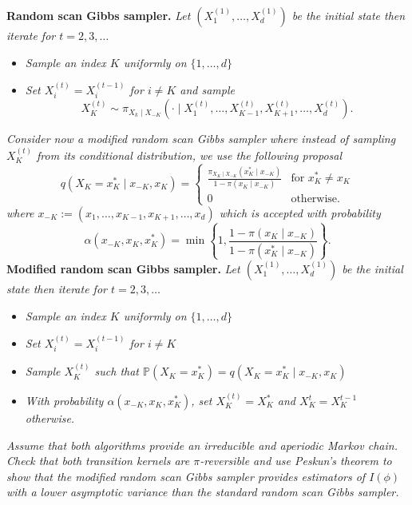\documentclass[a4paper,12pt]{article}
\newcommand{\pr}{\mathbb{P}}
\theoremstyle{definition}
\begin{document}
\begin{enumerate}
    {\bf Random scan Gibbs sampler.} {\it Let $(X_1^{(1)}, \dots, X_d^{(1)})$ be
    the initial state then iterate for $t=2,3,\dots$}
    \begin{itemize}
        \item {\it Sample an index $K$ uniformly on $\{1,\dots,d\}$}
        \item {\it Set $X_i^{(t)} = X_i^{(t-1)}$ for $i \neq K$ and sample}
        $$X_K^{(t)} \sim \pi_{X_k\mid X_{-K}}(\cdot \mid X_1^{(t)}, \dots,
        X_{K-1}^{(t)}, X_{K+1}^{(t)}, \dots, X_d^{(t)}).$$
    \end{itemize}
    {\it 
    Consider now a modified random scan Gibbs sampler where instead of
    sampling $X_K^{(t)}$ from its conditional distribution, we use the
    following proposal}
    $$q(X_K = x_K^* \mid x_{-K}, x_K) = \begin{cases}
        \frac{\pi_{X_K\mid X_{-K}}(x_K^*\mid x_{-K})}{1 - \pi(x_K\mid x_{-K})}
        &\text{for } x_K^* \neq x_K \\
        0 &\text{otherwise.}
    \end{cases}$$
    {\it where $x_{-K} := (x_1, \dots, x_{K-1}, x_{K+1}, \dots, x_d)$ which
    is accepted with probability}
    $$
    \alpha(x_{-K}, x_K, x_K^*) = \min\left\{1, \frac{1-\pi(x_K\mid x_{-K})}{1-\pi(x_K^*\mid x_{-K})}\right\}.
    $$
    {\bf Modified random scan Gibbs sampler.} {\it Let $(X_1^{(1)}, \dots, X_d^{(1)})$ be
    the initial state then iterate for $t=2,3,\dots$}
    \begin{itemize}
        \item {\it Sample an index $K$ uniformly on $\{1,\dots,d\}$}
        \item {\it Set $X_i^{(t)} = X_i^{(t-1)}$ for $i \neq K$} 
        \item {\it Sample $X_K^{(t)}$ such that $\pr(X_K = x_K^*) = q(X_K =
        x_K^* \mid x_{-K}, x_K)$}
        \item {\it With probability $\alpha(x_{-K}, x_K, x_K^*)$, set
        $X_K^{(t)} = X_K^*$ and $X_K^{t} = X_K^{t-1}$ otherwise.}
    \end{itemize}

    {\it Assume that both algorithms provide an irreducible and aperiodic Markov chain. Check that both
    transition kernels are $\pi$-reversible and use Peskun’s theorem to show that the modified random scan
    Gibbs sampler provides estimators of $I(\phi)$ with a lower asymptotic variance than the standard random
    scan Gibbs sampler.}


\end{enumerate}
\end{document}
